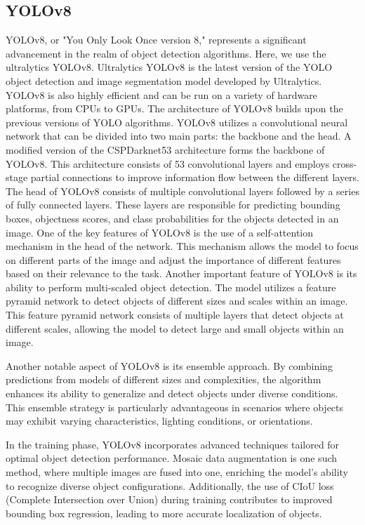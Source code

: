 \documentclass[Print]{../Style/isecure-v24}
\begin{document}
\subsection{YOLOv8} \label{sec:yolo}
YOLOv8, or "You Only Look Once version 8," represents a significant advancement in the realm of object detection algorithms.  Here, we use the ultralytics YOLOv8. Ultralytics YOLOv8 is the latest version of the YOLO object detection and image segmentation model developed by Ultralytics. YOLOv8 is also highly efficient and can be run on a variety of hardware platforms, from CPUs to GPUs. The architecture of YOLOv8 builds upon the previous versions of YOLO algorithms. YOLOv8 utilizes a convolutional neural network that can be divided into two main parts: the backbone and the head. 
A modified version of the CSPDarknet53 architecture forms the backbone of YOLOv8. This architecture consists of 53 convolutional layers and employs cross-stage partial connections to improve information flow between the different layers. The head of YOLOv8 consists of multiple convolutional layers followed by a series of fully connected layers. These layers are responsible for predicting bounding boxes, objectness scores, and class probabilities for the objects detected in an image.
One of the key features of YOLOv8 is the use of a self-attention mechanism in the head of the network. This mechanism allows the model to focus on different parts of the image and adjust the importance of different features based on their relevance to the task.
Another important feature of YOLOv8 is its ability to perform multi-scaled object detection. The model utilizes a feature pyramid network to detect objects of different sizes and scales within an image. This feature pyramid network consists of multiple layers that detect objects at different scales, allowing the model to detect large and small objects within an image.

Another notable aspect of YOLOv8 is its ensemble approach. By combining predictions from models of different sizes and complexities, the algorithm enhances its ability to generalize and detect objects under diverse conditions. This ensemble strategy is particularly advantageous in scenarios where objects may exhibit varying characteristics, lighting conditions, or orientations.

In the training phase, YOLOv8 incorporates advanced techniques tailored for optimal object detection performance. Mosaic data augmentation is one such method, where multiple images are fused into one, enriching the model's ability to recognize diverse object configurations. Additionally, the use of CIoU loss (Complete Intersection over Union) during training contributes to improved bounding box regression, leading to more accurate localization of objects.
\end{document}
